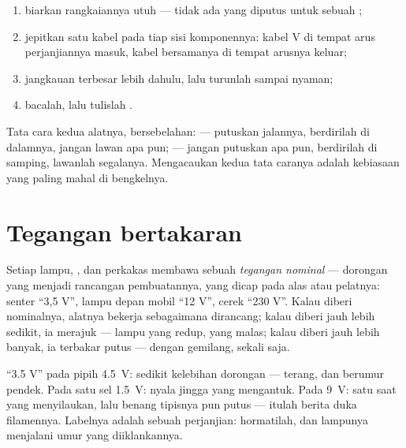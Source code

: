\begin{method}\label{met:g8:voltage-voltmeter:measure}
\begin{enumerate}
  \item biarkan rangkaiannya utuh --- tidak ada yang diputus untuk
        sebuah ;
  \item jepitkan satu kabel pada tiap sisi komponennya: kabel
        \unit{V} di tempat arus perjanjiannya masuk, kabel bersamanya
        di tempat arusnya keluar;
  \item jangkauan terbesar lebih dahulu, lalu turunlah sampai nyaman;
  \item bacalah, lalu tulislah .
\end{enumerate}
Tata cara kedua alatnya, bersebelahan:  --- putuskan
jalannya, berdirilah di dalamnya, jangan lawan apa pun;  ---
jangan putuskan apa pun, berdirilah di samping, lawanlah segalanya.
Mengacaukan kedua tata caranya adalah kebiasaan yang paling mahal di
bengkelnya.
\end{method}

\section{Tegangan bertakaran}

\begin{definition}\label{def:g8:voltage-voltmeter:nominal}
Setiap lampu, , dan perkakas membawa sebuah \emph{tegangan
nominal} --- dorongan yang menjadi rancangan
pembuatannya, yang dicap pada alas atau pelatnya:  senter ``3,5
V'', lampu depan mobil ``12 V'', cerek ``230 V''. Kalau diberi
 nominalnya, alatnya bekerja sebagaimana dirancang; kalau
diberi jauh lebih sedikit, ia merajuk --- lampu yang redup,  yang
malas; kalau diberi jauh lebih banyak, ia terbakar putus --- dengan
gemilang, sekali saja.
\end{definition}

\begin{example}\label{ex:g8:voltage-voltmeter:matching}
 ``3.5 V'' pada  pipih \qty{4.5}{V}: sedikit
kelebihan dorongan --- terang, dan berumur pendek. Pada satu sel
\qty{1.5}{V}: nyala jingga yang mengantuk. Pada  \qty{9}{V}:
satu saat yang menyilaukan, lalu benang tipisnya pun putus --- itulah
berita duka filamennya. Labelnya adalah sebuah perjanjian: hormatilah,
dan lampunya menjalani umur yang diiklankannya.
\end{example}

